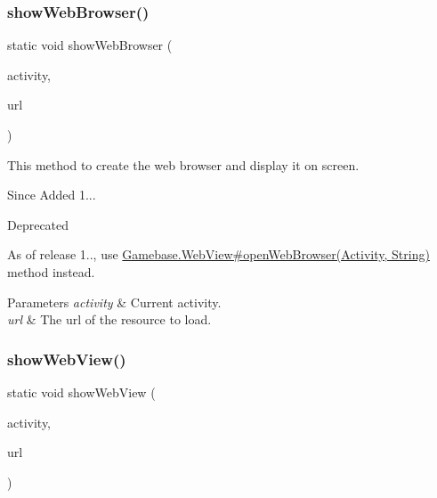 \subsubsection{\texorpdfstring{show\+Web\+Browser()}{showWebBrowser()}}
{\footnotesize\ttfamily static void show\+Web\+Browser (\begin{DoxyParamCaption}\item[{@Non\+Null final Activity}]{activity,  }\item[{@Non\+Null final String}]{url }\end{DoxyParamCaption})\hspace{0.3cm}{\ttfamily [static]}}



This method to create the web browser and display it on screen. 

\begin{DoxySince}{Since}
Added 1... 
\end{DoxySince}
\begin{DoxyRefDesc}{Deprecated}
\item[\hyperlink{deprecated__deprecated000005}{Deprecated}]As of release 1.., use \hyperlink{}{Gamebase.\+Web\+View\#open\+Web\+Browser(\+Activity, String)} method instead. \end{DoxyRefDesc}

\begin{DoxyParams}{Parameters}
{\em activity} & Current activity. \\
\hline
{\em url} & The url of the resource to load. \\
\hline
\end{DoxyParams}
\mbox{\label{classcom_1_1toast_1_1android_1_1gamebase_1_1_gamebase_1_1_web_view_ae3429d5340c6164295dc3ce3c3eb1b4c}} 
\subsubsection{\texorpdfstring{show\+Web\+View()}{showWebView()}\hspace{0.1cm}{\footnotesize\ttfamily [1/3]}}
{\footnotesize\ttfamily static void show\+Web\+View (\begin{DoxyParamCaption}\item[{@Non\+Null final Activity}]{activity,  }\item[{@Non\+Null final String}]{url }\end{DoxyParamCaption})\hspace{0.3cm}{\ttfamily [static]}}



